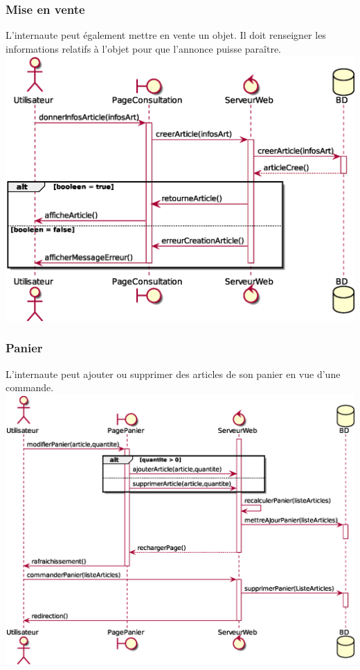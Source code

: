 \subsubsection{Mise en vente}
L'internaute peut également mettre en vente un objet. Il doit renseigner les informations relatifs à l'objet pour que l'annonce puisse paraître. \\
\includegraphics[width=17cm]{Images/DSEQ_MiseEnVente} \\
\newpage
\subsubsection{Panier}
L'internaute peut ajouter ou supprimer des articles de son panier en vue d'une commande. \\
\includegraphics[width=17cm]{Images/DSEQ_Panier} \\
\newpage
